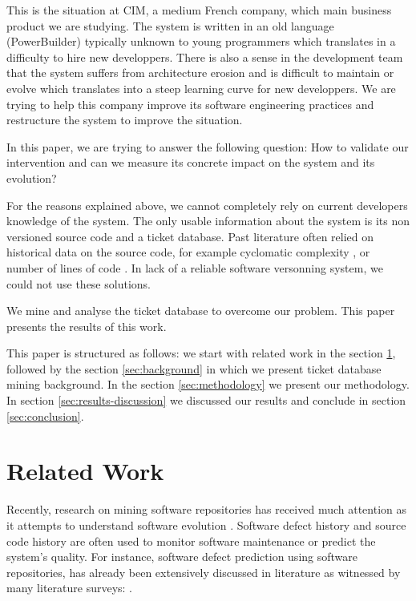 \documentclass[10pt,conference]{IEEEtran}
\begin{document}
This is the situation at CIM, a medium French company, which main business product we are studying.
The system is written in an old language (PowerBuilder) typically unknown to young programmers which translates in a difficulty to hire new developpers.
There is also a sense in the development team that the system suffers from architecture erosion and is difficult to maintain or evolve which translates into a steep learning curve for new developpers.
We are trying to help this company improve its software engineering practices and restructure the system to improve the situation.

In this paper, we are trying to answer the following question:
How to validate our intervention and can we measure its concrete impact on the system and its evolution?

For the reasons explained above, we cannot completely rely on current developers knowledge of the system.
The only usable information about the system is its non versioned source code and a ticket database.
Past literature often relied on historical data on the source code, for example
cyclomatic complexity \cite{gill91}, or number of lines of code \cite{port18}.
In lack of a reliable software versonning system, we could not use these solutions.

We mine and analyse the ticket database to overcome our problem.
This paper presents the results of this work.

 This paper is structured as follows: we start with related work in the section \ref{sec:related-work}, followed by  the section \ref{sec:background}  in which we present ticket database mining background. 
 In the section \ref{sec:methodology} we present our methodology. In section \ref{sec:results-discussion} we discussed our results and   conclude in section \ref{sec:conclusion}.
 
\section{Related Work}
\label{sec:related-work}
Recently, research on mining software repositories has received much attention as it attempts to  understand  software  evolution \cite{Zhan10a}.
Software defect history and source code history are often used to monitor software maintenance or predict the system's quality. 
For instance, software defect prediction using software repositories, has already been extensively discussed in literature as witnessed by many literature surveys: \cite{Catal09,Hall12,Hoss17,Li19a,malh15}.
\end{document}
